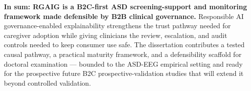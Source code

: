 \bigskip

\textbf{In sum: RGAIG is a B2C-first ASD screening-support and monitoring framework made defensible by B2B clinical governance.} Responsible AI governance-enabled explainability strengthens the trust pathway needed for caregiver adoption while giving clinicians the review, escalation, and audit controls needed to keep consumer use safe. The dissertation contributes a tested causal pathway, a practical maturity framework, and a defensibility scaffold for doctoral examination --- bounded to the ASD-EEG empirical setting and ready for the prospective future B2C prospective-validation studies that will extend it beyond controlled validation.
